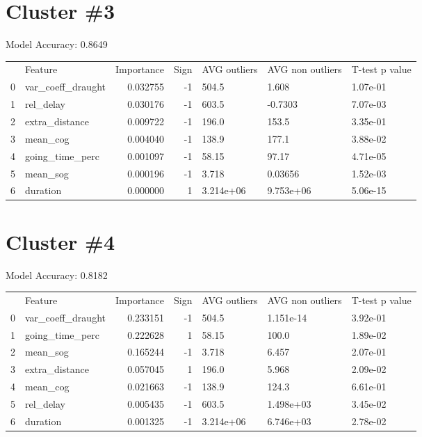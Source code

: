 \section*{Cluster \#3}
Model Accuracy: 0.8649


\begin{tabular}{llrrlll}
 & Feature & Importance & Sign & AVG outliers & AVG non outliers & T-test p value \\
0 & var\_coeff\_draught & 0.032755 & -1 & 504.5 & 1.608 & 1.07e-01 \\
1 & rel\_delay & 0.030176 & -1 & 603.5 & -0.7303 & 7.07e-03 \\
2 & extra\_distance & 0.009722 & -1 & 196.0 & 153.5 & 3.35e-01 \\
3 & mean\_cog & 0.004040 & -1 & 138.9 & 177.1 & 3.88e-02 \\
4 & going\_time\_perc & 0.001097 & -1 & 58.15 & 97.17 & 4.71e-05 \\
5 & mean\_sog & 0.000196 & -1 & 3.718 & 0.03656 & 1.52e-03 \\
6 & duration & 0.000000 & 1 & 3.214e+06 & 9.753e+06 & 5.06e-15 \\
\end{tabular}



\section*{Cluster \#4}
Model Accuracy: 0.8182


\begin{tabular}{llrrlll}
 & Feature & Importance & Sign & AVG outliers & AVG non outliers & T-test p value \\
0 & var\_coeff\_draught & 0.233151 & -1 & 504.5 & 1.151e-14 & 3.92e-01 \\
1 & going\_time\_perc & 0.222628 & 1 & 58.15 & 100.0 & 1.89e-02 \\
2 & mean\_sog & 0.165244 & -1 & 3.718 & 6.457 & 2.07e-01 \\
3 & extra\_distance & 0.057045 & 1 & 196.0 & 5.968 & 2.09e-02 \\
4 & mean\_cog & 0.021663 & -1 & 138.9 & 124.3 & 6.61e-01 \\
5 & rel\_delay & 0.005435 & -1 & 603.5 & 1.498e+03 & 3.45e-02 \\
6 & duration & 0.001325 & -1 & 3.214e+06 & 6.746e+03 & 2.78e-02 \\
\end{tabular}



